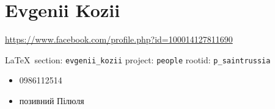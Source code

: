  
 
\section{Evgenii Kozii}
\url{https://www.facebook.com/profile.php?id=100014127811690}
  
\vspace{0.5cm}
 {\ifDEBUG\small\LaTeX~section: \verb|evgenii_kozii| project: \verb|people| rootid: \verb|p_saintrussia|	\fi}
\vspace{0.5cm}


\begin{itemize}
\item 0986112514
\item позивний Пілюля
\end{itemize}


